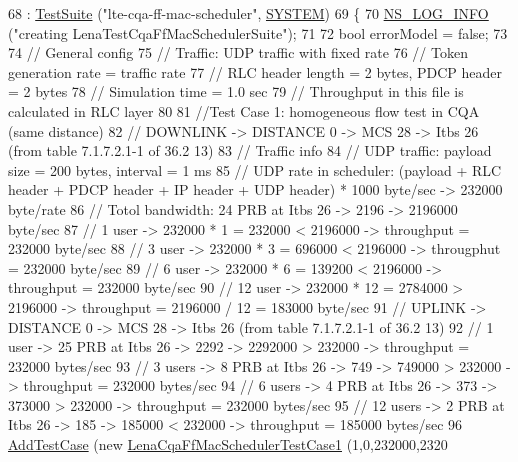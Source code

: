 \begin{DoxyCode}
68   : \hyperlink{classns3_1_1TestSuite_a904b0c40583b744d30908aeb94636d1a}{TestSuite} (\textcolor{stringliteral}{"lte-cqa-ff-mac-scheduler"}, \hyperlink{classns3_1_1TestSuite_a1ebfcab34ec8161e085e8e3a1855eae0a90c5529a26ab3a5ffcc6e57040dbd82e}{SYSTEM})
69 \{
70   \hyperlink{group__logging_gafbd73ee2cf9f26b319f49086d8e860fb}{NS\_LOG\_INFO} (\textcolor{stringliteral}{"creating LenaTestCqaFfMacSchedulerSuite"});
71 
72   \textcolor{keywordtype}{bool} errorModel = \textcolor{keyword}{false};
73 
74   \textcolor{comment}{// General config}
75   \textcolor{comment}{// Traffic: UDP traffic with fixed rate}
76   \textcolor{comment}{// Token generation rate = traffic rate}
77   \textcolor{comment}{// RLC header length = 2 bytes, PDCP header = 2 bytes}
78   \textcolor{comment}{// Simulation time = 1.0 sec}
79   \textcolor{comment}{// Throughput in this file is calculated in RLC layer}
80 
81   \textcolor{comment}{//Test Case 1: homogeneous flow test in CQA (same distance)}
82   \textcolor{comment}{// DOWNLINK -> DISTANCE 0 -> MCS 28 -> Itbs 26 (from table 7.1.7.2.1-1 of 36.2    13)}
83   \textcolor{comment}{// Traffic info}
84   \textcolor{comment}{//   UDP traffic: payload size = 200 bytes, interval = 1 ms}
85   \textcolor{comment}{//   UDP rate in scheduler: (payload + RLC header + PDCP header + IP header + UDP header) * 1000 byte/sec
       -> 232000 byte/rate }
86   \textcolor{comment}{// Totol bandwidth: 24 PRB at Itbs 26 -> 2196 -> 2196000 byte/sec}
87   \textcolor{comment}{// 1 user -> 232000 * 1 = 232000 < 2196000 -> throughput = 232000 byte/sec}
88   \textcolor{comment}{// 3 user -> 232000 * 3 = 696000 < 2196000 -> througphut = 232000 byte/sec}
89   \textcolor{comment}{// 6 user -> 232000 * 6 = 139200 < 2196000 -> throughput = 232000 byte/sec}
90   \textcolor{comment}{// 12 user -> 232000 * 12 = 2784000 > 2196000 -> throughput = 2196000 / 12 = 183000 byte/sec}
91   \textcolor{comment}{// UPLINK -> DISTANCE 0 -> MCS 28 -> Itbs 26 (from table 7.1.7.2.1-1 of 36.2    13)}
92   \textcolor{comment}{// 1 user -> 25 PRB at Itbs 26 -> 2292 -> 2292000 > 232000 -> throughput = 232000 bytes/sec}
93   \textcolor{comment}{// 3 users -> 8 PRB at Itbs 26 -> 749 -> 749000 > 232000 -> throughput = 232000 bytes/sec }
94   \textcolor{comment}{// 6 users -> 4 PRB at Itbs 26 -> 373 -> 373000 > 232000 -> throughput = 232000 bytes/sec}
95   \textcolor{comment}{// 12 users -> 2 PRB at Itbs 26 -> 185 -> 185000 < 232000 -> throughput = 185000 bytes/sec}
96   \hyperlink{classns3_1_1TestCase_a3718088e3eefd5d6454569d2e0ddd835}{AddTestCase} (\textcolor{keyword}{new} \hyperlink{classLenaCqaFfMacSchedulerTestCase1}{LenaCqaFfMacSchedulerTestCase1} (1,0,232000,2320

\end{DoxyCode}
